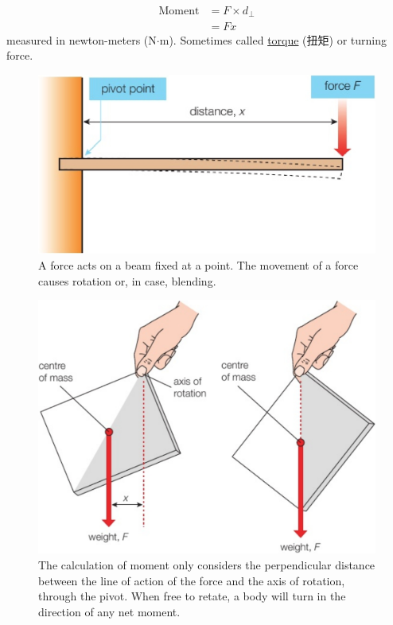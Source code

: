 \begin{itemize}
\begin{equation}
\begin{split}
            \text{Moment} &= F \times d_{\perp} \\
            &= Fx
        \end{split}
    \end{equation}
    measured in newton-meters (N$\cdot$m). Sometimes called \underline{torque} (扭矩) or turning force.
    \begin{figure}[H]
        \centering
        \includegraphics[scale=0.12]{Physics/1A/Images/1A-4-1.png}
        \caption{A force acts on a beam fixed at a point. The movement of a force causes rotation or, in case, blending.}
    \end{figure}
    \begin{figure}[H]
        \centering
        \includegraphics[scale=0.15]{Physics/1A/Images/1A-4-2.png}
        \caption{The calculation of moment only considers the perpendicular distance between the line of action of the force
        and the axis of rotation, through the pivot. When free to retate, a body will turn in the direction of any net moment.}

\end{figure}
\end{itemize}
